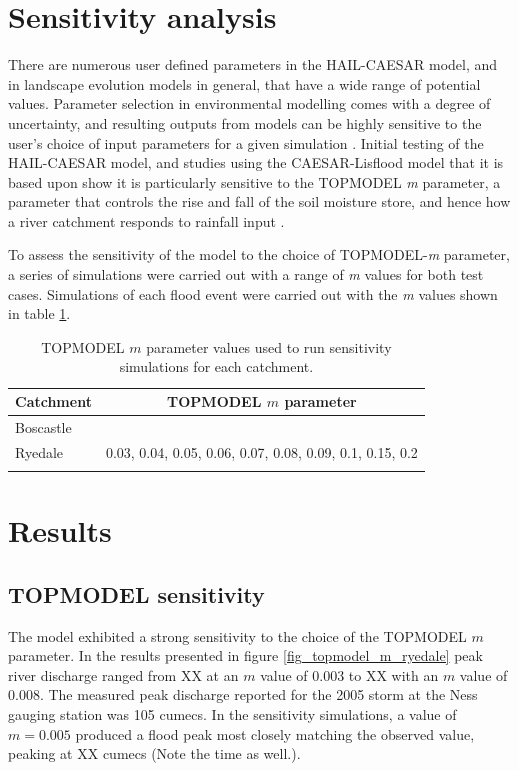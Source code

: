 \section{Sensitivity analysis}
There are numerous user defined parameters in the HAIL-CAESAR model, and in landscape evolution models in general, that have a wide range of potential values. Parameter selection in environmental modelling comes with a degree of uncertainty, and resulting outputs from models can be highly sensitive to the user's choice of input parameters for a given simulation \citep{Pelletier2012}. Initial testing of the HAIL-CAESAR model, and studies using the CAESAR-Lisflood model that it is based upon show it is particularly sensitive to the TOPMODEL \textit{m} parameter, a parameter that controls the rise and fall of the soil moisture store, and hence how a river catchment responds to rainfall input \citep{beven1979physically}. 

To assess the sensitivity of the model to the choice of TOPMODEL-\textit{m} parameter, a series of simulations were carried out with a range of \textit{m} values for both test cases. Simulations of each flood event were carried out with the \textit{m} values shown in table \ref{table-m-sens}.

\begin{table}
\begin{tabular}{lc}
\textbf{Catchment} & \textbf{TOPMODEL \(m\) parameter} \\
\hline
Boscastle   &                                            \\
Ryedale     & 0.03, 0.04, 0.05, 0.06, 0.07, 0.08, 0.09, 0.1, 0.15, 0.2  \\
\hline
\\ 
\end{tabular}
\caption{TOPMODEL \(m\) parameter values used to run sensitivity simulations for each catchment.}
\label{table-m-sens}
\end{table}

\section{Results}

\subsection{TOPMODEL sensitivity}

The model exhibited a strong sensitivity to the choice of the TOPMODEL \( m\) parameter. In the results presented in figure \ref{fig_topmodel_m_ryedale} peak river discharge ranged from XX at an \(m\) value of 0.003 to XX with an \(m\) value of 0.008. The measured peak discharge reported for the 2005 storm at the Ness gauging station was 105 cumecs. In the sensitivity simulations, a value of \(m = 0.005\) produced a flood peak most closely matching the observed value, peaking at XX cumecs (Note the time as well.). 

